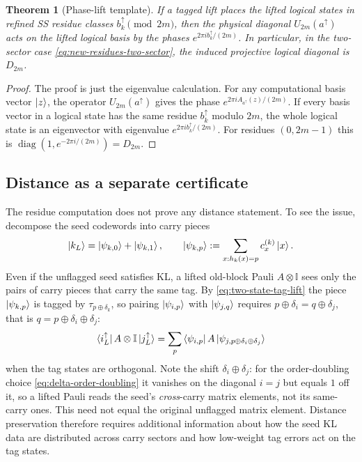 \documentclass[11pt]{article}
\newcommand{\diag}{\operatorname{diag}}
\newcommand{\id}{\mathbb I}
\newtheorem{theorem}{Theorem}[section]
\begin{document}
\begin{theorem}[Phase-lift template]
\label{thm:phase-lift-template}
If a tagged lift places the lifted logical states in refined SS residue classes
$b_k^{\uparrow}\pmod {2m}$, then the physical diagonal $U_{2m}(a^{\uparrow})$ acts on the lifted
logical basis by the phases $e^{2\pi i b_k^{\uparrow}/(2m)}$.  In particular, in the two-sector
case \eqref{eq:new-residues-two-sector}, the induced projective logical diagonal is $D_{2m}$.
\end{theorem}

\begin{proof}
The proof is just the eigenvalue calculation.  For any computational basis vector
$\ket{z}$, the operator $U_{2m}(a^{\uparrow})$ gives the phase
$e^{2\pi i A_{a^{\uparrow}}(z)/(2m)}$.  If every basis vector in a logical state has the same
residue $b_k^{\uparrow}$ modulo $2m$, the whole logical state is an eigenvector with eigenvalue
$e^{2\pi i b_k^{\uparrow}/(2m)}$.  For residues $(0,2m-1)$ this is
$\diag(1,e^{-2\pi i/(2m)})=D_{2m}$.
\end{proof}

\subsection{Distance as a separate certificate}

The residue computation does not prove any distance statement.  To see the issue, decompose the
seed codewords into carry pieces
\begin{equation}
  \ket{k_L}=\ket{\psi_{k,0}}+\ket{\psi_{k,1}},
  \qquad
  \ket{\psi_{k,p}}:=\sum_{x:h_k(x)=p} c_x^{(k)}\ket{x}.
  \label{eq:carry-decomposition}
\end{equation}
Even if the unflagged seed satisfies KL, a lifted old-block Pauli $A\otimes\id$ sees only the
pairs of carry pieces that carry the same tag.  By \eqref{eq:two-state-tag-lift} the piece
$\ket{\psi_{k,p}}$ is tagged by $\tau_{p\oplus\delta_k}$, so pairing $\ket{\psi_{i,p}}$ with
$\ket{\psi_{j,q}}$ requires $p\oplus\delta_i=q\oplus\delta_j$, that is
$q=p\oplus\delta_i\oplus\delta_j$:
\begin{equation}
  \bra{i_L^{\uparrow}}A\otimes\id\ket{j_L^{\uparrow}}
  =\sum_p \bra{\psi_{i,p}}A\ket{\psi_{j,p\oplus\delta_i\oplus\delta_j}}
  \label{eq:old-pauli-sees-same-carry}
\end{equation}
when the tag states are orthogonal.  Note the shift $\delta_i\oplus\delta_j$: for the
order-doubling choice \eqref{eq:delta-order-doubling} it vanishes on the diagonal $i=j$ but
equals $1$ off it, so a lifted Pauli reads the seed's \emph{cross}-carry matrix elements, not
its same-carry ones.  This need not equal the original unflagged matrix element.
Distance preservation therefore requires additional information about how the seed KL data are
distributed across carry sectors and how low-weight tag errors act on the tag states.
\end{document}
